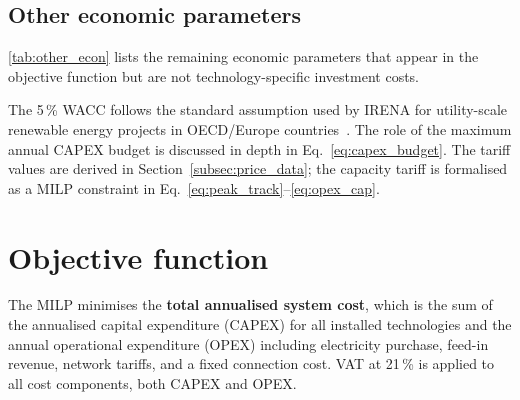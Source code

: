 \documentclass[11pt,a4paper]{report}
\begin{document}
\subsection{Other economic parameters}
\label{sub:other_econ}

\autoref{tab:other_econ} lists the remaining economic parameters that appear in the
objective function but are not technology-specific investment costs.

\begin{table}[H]
\centering
\caption{Other economic parameters used in the objective function.}
\label{tab:other_econ}
\end{table}

\noindent The 5\,\% WACC follows the standard assumption used by IRENA for utility-scale
renewable energy projects in OECD/Europe countries~\cite{IRENA2023Costs}.
The role of the maximum annual CAPEX budget is discussed in depth in
Eq.~\eqref{eq:capex_budget}.
The tariff values are derived in Section~\ref{subsec:price_data}; the capacity tariff
is formalised as a MILP constraint in Eq.~\eqref{eq:peak_track}--\eqref{eq:opex_cap}.

\section{Objective function}
\label{sec:objective_function}

The MILP minimises the \textbf{total annualised system cost}, which is the sum of
the annualised capital expenditure (CAPEX) for all installed technologies and the
annual operational expenditure (OPEX) including electricity purchase, feed-in
revenue, network tariffs, and a fixed connection cost.
VAT at 21\,\% is applied to all cost components, both CAPEX and OPEX.
\end{document}
